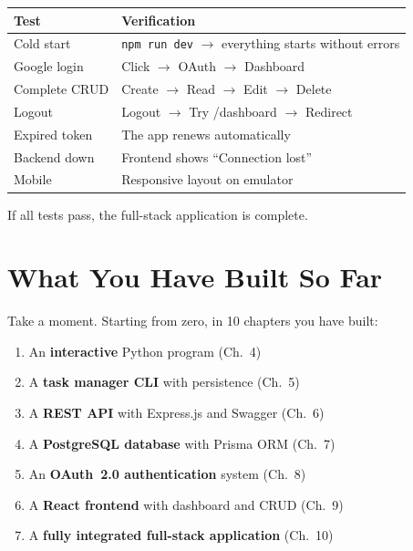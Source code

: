 \begin{center}
\begin{tabularx}{\textwidth}{l X}
\toprule
\textbf{Test} & \textbf{Verification} \\
\midrule
Cold start & \texttt{npm run dev} $\rightarrow$ everything starts without errors \\
Google login & Click $\rightarrow$ OAuth $\rightarrow$ Dashboard \\
Complete CRUD & Create $\rightarrow$ Read $\rightarrow$ Edit $\rightarrow$ Delete \\
Logout & Logout $\rightarrow$ Try /dashboard $\rightarrow$ Redirect \\
Expired token & The app renews automatically \\
Backend down & Frontend shows ``Connection lost'' \\
Mobile & Responsive layout on emulator \\
\bottomrule
\end{tabularx}
\end{center}

\begin{checkpointbox}
If all tests pass, the full-stack application is complete.
\end{checkpointbox}

\section*{What You Have Built So Far}

Take a moment. Starting from zero, in 10 chapters you have built:

\begin{enumerate}
  \item An \textbf{interactive} Python program (Ch.~4)
  \item A \textbf{task manager CLI} with persistence (Ch.~5)
  \item A \textbf{REST API} with Express.js and Swagger (Ch.~6)
  \item A \textbf{PostgreSQL database} with Prisma ORM (Ch.~7)
  \item An \textbf{OAuth~2.0 authentication} system (Ch.~8)
  \item A \textbf{React frontend} with dashboard and CRUD (Ch.~9)
  \item A \textbf{fully integrated full-stack application} (Ch.~10)
\end{enumerate}

